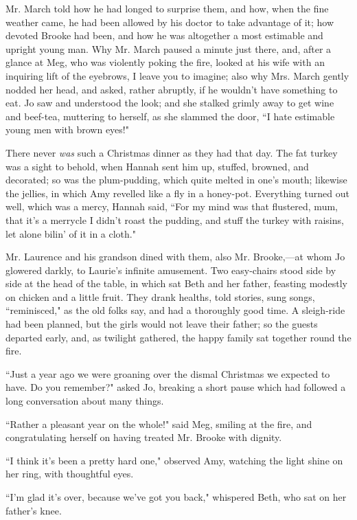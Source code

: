 Mr. March told how he had longed to surprise them, and how, when the
fine weather came, he had been allowed by his doctor to take advantage
of it; how devoted Brooke had been, and how he was altogether a most
estimable and upright young man. Why Mr. March paused a minute just
there, and, after a glance at Meg, who was violently poking the fire,
looked at his wife with an inquiring lift of the eyebrows, I leave you
to imagine; also why Mrs. March gently nodded her head, and asked,
rather abruptly, if he wouldn't have something to eat.
Jo saw and understood the look; and she stalked grimly away to get wine
and beef-tea, muttering to herself, as she slammed the door, ``I hate
estimable young men with brown eyes!"

There never \emph{was} such a Christmas dinner as they had that day. The
fat turkey was a sight to behold, when Hannah sent him up, stuffed,
browned, and decorated; so was the plum-pudding, which quite melted in
one's mouth; likewise the jellies, in which Amy revelled
like a fly in a honey-pot. Everything turned out well, which was a
mercy, Hannah said, ``For my mind was that flustered, mum, that
it's a merrycle I didn't roast the
pudding, and stuff the turkey with raisins, let alone
bilin' of it in a cloth."

Mr. Laurence and his grandson dined with them, also Mr. Brooke,---at
whom Jo glowered darkly, to Laurie's infinite amusement.
Two easy-chairs stood side by side at the head of the table, in which
sat Beth and her father, feasting modestly on chicken and a little
fruit. They drank healths, told stories, sung songs, ``reminisced," as
the old folks say, and had a thoroughly good time. A sleigh-ride had
been planned, but the girls would not leave their father; so the guests
departed early, and, as twilight gathered, the happy family sat together
round the fire.

``Just a year ago we were groaning over the dismal Christmas we expected
to have. Do you remember?" asked Jo, breaking a short pause which had
followed a long conversation about many things.

``Rather a pleasant year on the whole!" said Meg, smiling at the fire,
and congratulating herself on having treated Mr. Brooke with dignity.

``I think it's been a pretty hard one," observed Amy,
watching the light shine on her ring, with thoughtful eyes.

``I'm glad it's over, because
we've got you back," whispered Beth, who sat on her
father's knee.

